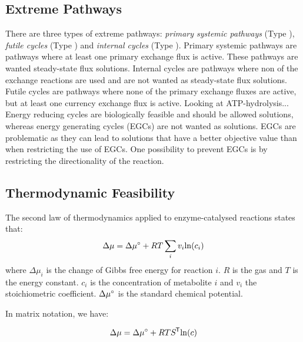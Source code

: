 \subsection{Extreme Pathways}
There are three types of extreme pathways: \textit{primary systemic pathways} (Type ), \textit{futile cycles} (Type ) and \textit{internal cycles} (Type ).  
Primary systemic pathways are pathways where at least one primary exchange flux is active. These pathways are wanted steady-state flux solutions. Internal cycles are pathways where non of the exchange reactions are used and are not wanted as steady-state flux solutions. Futile cycles are pathways where none of the primary exchange fluxes are active, but at least one currency exchange flux is active. Looking at ATP-hydrolysis...  Energy reducing cycles are biologically feasible and should be allowed solutions, whereas energy generating cycles (EGCs) are not wanted as solutions. EGCs are problematic as they can lead to solutions that have a better objective value than when restricting the use of EGCs. One possibility to prevent EGCs is by restricting the directionality of the reaction. 

\cite{noor_removing_2018}

\subsection{Thermodynamic Feasibility}

The second law of thermodynamics applied to enzyme-catalysed reactions states that: 
\begin{equation}
    \Delta \mu = \Delta \mu \degree + RT \sum_{i} v_i \mathrm{ln} (c_i)
    \label{Eq:lawOfThermodynamics}
\end{equation}
where $\Delta \mu_i$ is the change of Gibbs free energy for reaction $i$. $R$ is the gas and $T$ is the energy constant. $c_i$ is the concentration of metabolite $i$ and $v_i$ the stoichiometric coefficient. $\Delta \mu \degree$ is the standard chemical potential. 

In matrix notation, we have:

\begin{equation}
    \Delta \mu = \Delta \mu \degree + RT S ^{\mkern-1.5mu\mathsf{T}} \mathrm{ln}(c)
\end{equation}

